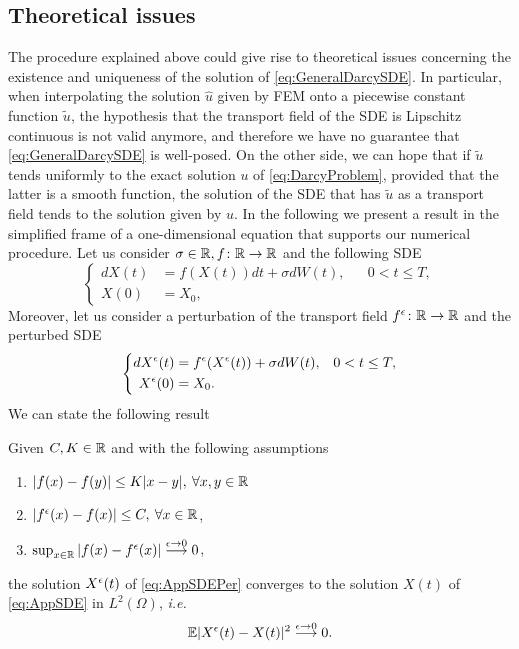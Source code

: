 \subsection{Theoretical issues}
The procedure explained above could give rise to theoretical issues concerning the existence and uniqueness of the solution of \eqref{eq:GeneralDarcySDE}. In particular, when interpolating the solution $\hat{u}$ given by FEM onto a piecewise constant function $\tilde{u}$, the hypothesis that the transport field of the SDE is Lipschitz continuous is not valid anymore, and therefore we have no guarantee that \eqref{eq:GeneralDarcySDE} is well-posed. On the other side, we can hope that if $\tilde{u}$ tends uniformly to the exact solution $u$ of \eqref{eq:DarcyProblem}, provided that the latter is a smooth function, the solution of the SDE that has $\tilde{u}$ as a transport field tends to the solution given by $u$. In the following we present a result in the simplified frame of a one-dimensional equation that supports our numerical procedure. Let us consider $\sigma \in \mathbb{R}, f\colon \mathbb{R} \rightarrow \mathbb{R}$ and the following SDE
\begin{equation}\label{eq:AppSDE}
\left \{
\begin{aligned}
	dX(t) &= f(X(t))dt + \sigma dW(t), && 0 < t \leq T, \\
	X(0) &= X_0,
\end{aligned} \right .
\end{equation}
Moreover, let us consider a perturbation of the transport field $f^\epsilon\colon \mathbb{R} \rightarrow \mathbb{R} $ and the perturbed SDE 
\begin{equation}\label{eq:AppSDEPer}
\left \{
\begin{aligned}
	dX^\epsilon(t) &= f^\epsilon(X^\epsilon(t)) + \sigma dW(t), && 0 < t \leq T, \\
	X^\epsilon(0) &= X_0.
\end{aligned} \right .
\end{equation}
We can state the following result
\begin{theorem} Given $C,K \in \mathbb{R}$ and with the following assumptions
\begin{enumerate}
	\item $|f(x) - f(y)| \leq K|x - y|, \: \forall x,y \in \mathbb{R}$
	\item $|f^\epsilon (x) - f(x)| \leq C, \: \forall x \in \mathbb{R}$,
 	\item $\sup_{x\in \mathbb{R}}|f(x) - f^\epsilon(x)| \stackrel{\epsilon \rightarrow 0}\longrightarrow 0$,
\end{enumerate}
the solution $X^\epsilon(t)$ of \eqref{eq:AppSDEPer} converges to the solution $X(t)$ of \eqref{eq:AppSDE} in $L^2(\Omega)$, \textit{i.e.}
\begin{equation*}
	\mathbb{E} |X^\epsilon(t) - X(t)|^2 \stackrel{\epsilon \rightarrow 0}\longrightarrow 0.
\end{equation*}
\end{theorem}

